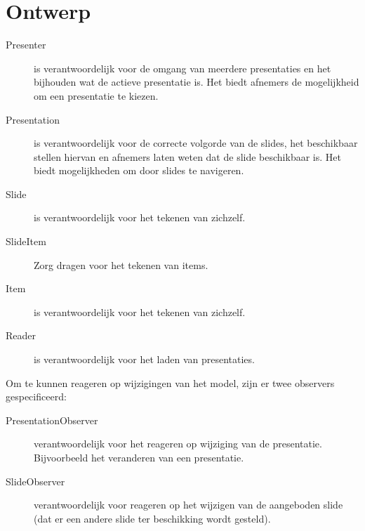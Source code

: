 \documentclass[a4paper]{article}
\begin{document}
\section{Ontwerp}
\begin{description}
\item[Presenter] is verantwoordelijk voor de omgang van meerdere presentaties en het bijhouden wat de actieve presentatie is. Het biedt afnemers de mogelijkheid om een presentatie te kiezen.
\item[Presentation] is verantwoordelijk voor de correcte volgorde van de slides, het beschikbaar stellen hiervan en afnemers laten weten dat de slide beschikbaar is. Het biedt mogelijkheden om door slides te navigeren.
\item[Slide] is verantwoordelijk voor het tekenen van zichzelf.
\item[SlideItem] Zorg dragen voor het tekenen van items.
\item[Item] is verantwoordelijk voor het tekenen van zichzelf.
\item[Reader] is verantwoordelijk voor het laden van presentaties.
\end{description}
Om te kunnen reageren op wijzigingen van het model, zijn er twee observers gespecificeerd:
\begin{description}
\item[PresentationObserver] verantwoordelijk voor het reageren op wijziging van de presentatie. Bijvoorbeeld het veranderen van een presentatie.
\item[SlideObserver] verantwoordelijk voor reageren op het wijzigen van de aangeboden slide (dat er een andere slide ter beschikking wordt gesteld).
\end{description}
\end{document}
